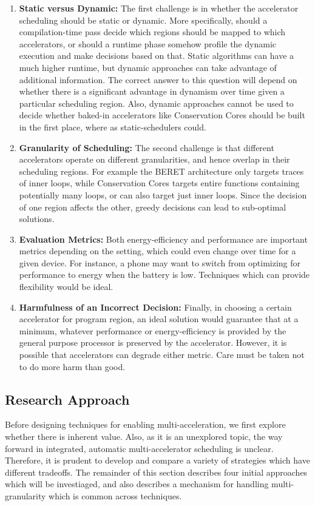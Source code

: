 \begin{enumerate}

\item \textbf{Static versus Dynamic:} The first challenge is in whether the
accelerator scheduling should be static or dynamic.  More specifically, should a
compilation-time pass decide which regions should be mapped to which
accelerators, or should a runtime phase somehow profile the dynamic execution
and make decisions based on that.  Static algorithms can have a much higher
runtime, but dynamic approaches can take advantage of additional information.
The correct answer to this question will depend on whether there is a significant 
advantage in dynamism over time given a particular scheduling region.
Also, dynamic approaches cannot be used to decide whether baked-in accelerators
like Conservation Cores should be built in the first place, where as static-schedulers
could.

\item \textbf{Granularity of Scheduling:} The second challenge is that different
accelerators operate on different granularities, and hence overlap in their
scheduling regions.  For example the BERET architecture only targets traces of
inner loops, while Conservation Cores targets entire functions containing
potentially many loops, or can also target just inner loops.  
Since the decision of one region affects the other,
greedy decisions can lead to sub-optimal solutions. 

\item \textbf{Evaluation Metrics:}
Both energy-efficiency and performance are important metrics depending on the
setting, which could even change over time for a given device.  For instance,
a phone may want to switch from optimizing for performance to energy when
the battery is low.  Techniques which can provide flexibility would be ideal.

\item \textbf{Harmfulness of an Incorrect Decision:} Finally, in choosing a
certain accelerator for program region, an ideal solution would guarantee that
at a minimum, whatever performance or energy-efficiency is provided by the
general purpose processor is preserved by the accelerator.  However, it is
possible that accelerators can degrade either metric.  Care must be
taken not to do more harm than good.

\end{enumerate}

\subsection{Research Approach} Before designing techniques for enabling
multi-acceleration, we first explore whether there is inherent value.  Also, as
it is an unexplored topic, the way forward in integrated, automatic 
multi-accelerator scheduling is
unclear.  Therefore, it is prudent to develop and compare a variety of
strategies which have different tradeoffs.  The remainder of this section
describes four initial approaches which will be investiaged, and also describes
a mechanism for handling multi-granularity which is common across techniques.

